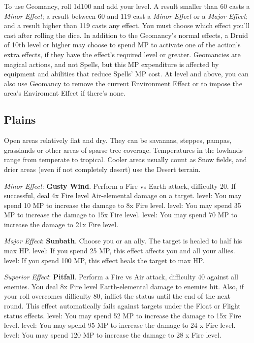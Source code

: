 To use Geomancy, roll 1d100 and add your level. A result smaller than 60 casts a \textit{Minor Effect}; a result between 60 and 119 cast a \textit{Minor Effect} or a \textit{Major Effect}; and a result higher than 119 casts any effect.  You must choose which effect you'll cast after rolling the dice. In addition to the Geomancy’s normal  effects, a Druid of 10th level or higher may choose to spend MP to activate one of the action’s extra effects,  if they have the effect’s required level or greater. Geomancies are magical actions, and not Spells, but this  MP expenditure is affected by equipment and abilities that reduce Spells’ MP cost. At  level and above, you can also use Geomancy to remove the current Environment Effect or to impose the area's Enviroment Effect if there's none.

\begin{multicols}{2}
\subsection*{Plains}\label{subsec:geo-plains}
	
Open areas relatively flat and dry. They can be savannas, steppes, pampas, grasslands or other areas of sparse tree coverage. Temperatures in the  lowlands range from temperate to tropical. Cooler  areas usually count as Snow fields, and drier areas  (even if not completely desert) use the Desert  terrain.

\textit{Minor Effect}: \textbf{Gusty Wind}. Perform a Fire vs Earth attack, difficulty 20. If successful, deal 4x Fire level Air-elemental damage on a target.  level: You may spend 10 MP to increase the damage to 8x Fire level.  level: You may spend 35 MP to increase the damage to 15x Fire level.  level: You may spend 70 MP to increase the damage to 21x Fire level.

\textit{Major Effect}: \textbf{Sunbath}. Choose you or an ally. The target is healed to half his max HP\@.  level: If you spend 25 MP, this effect affects you and all your allies.  level: If you spend 100 MP, this effect heals the target to max HP\@. %

\textit{Superior Effect}: \textbf{Pitfall}. Perform a Fire vs Air attack, difficulty 40 against all enemies. You deal 8x Fire level Earth-elemental damage to enemies hit. Also, if your roll overcomes difficulty 80, inflict the  status until the end of the next round. This effect automatically fails against targets under the Float or Flight status effects.  level: You may spend 52 MP to increase the damage to 15x Fire level.  level: You may spend 95 MP to increase the damage to 24 x Fire level.  level: You may spend 120 MP to increase the damage to 28 x Fire level.


\end{multicols}
